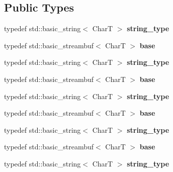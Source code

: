 \subsection*{Public Types}
\begin{DoxyCompactItemize}
\item 
\mbox{\label{structtestbuf_a0576cc53e1f395f08cee680528575b9f}} 
typedef std\+::basic\+\_\+string$<$ CharT $>$ {\bfseries string\+\_\+type}
\item 
\mbox{\label{structtestbuf_a24884ed0e0845a4640bb2b7cbdf60ad6}} 
typedef std\+::basic\+\_\+streambuf$<$ CharT $>$ {\bfseries base}
\item 
\mbox{\label{structtestbuf_a0576cc53e1f395f08cee680528575b9f}} 
typedef std\+::basic\+\_\+string$<$ CharT $>$ {\bfseries string\+\_\+type}
\item 
\mbox{\label{structtestbuf_a24884ed0e0845a4640bb2b7cbdf60ad6}} 
typedef std\+::basic\+\_\+streambuf$<$ CharT $>$ {\bfseries base}
\item 
\mbox{\label{structtestbuf_a0576cc53e1f395f08cee680528575b9f}} 
typedef std\+::basic\+\_\+string$<$ CharT $>$ {\bfseries string\+\_\+type}
\item 
\mbox{\label{structtestbuf_a24884ed0e0845a4640bb2b7cbdf60ad6}} 
typedef std\+::basic\+\_\+streambuf$<$ CharT $>$ {\bfseries base}
\item 
\mbox{\label{structtestbuf_a0576cc53e1f395f08cee680528575b9f}} 
typedef std\+::basic\+\_\+string$<$ CharT $>$ {\bfseries string\+\_\+type}
\item 
\mbox{\label{structtestbuf_a24884ed0e0845a4640bb2b7cbdf60ad6}} 
typedef std\+::basic\+\_\+streambuf$<$ CharT $>$ {\bfseries base}
\item 
\mbox{\label{structtestbuf_a0576cc53e1f395f08cee680528575b9f}} 
typedef std\+::basic\+\_\+string$<$ CharT $>$ {\bfseries string\+\_\+type}
\item 
\mbox{\label{structtestbuf_a24884ed0e0845a4640bb2b7cbdf60ad6}} 

\end{DoxyCompactItemize}
